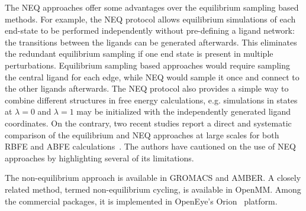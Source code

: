 \documentclass[9pt,bestpractices]{livecoms}
\begin{document}
The NEQ approaches offer some advantages over the equilibrium sampling based methods. For example, the NEQ protocol allows equilibrium simulations of each end-state to be performed independently without pre-defining a ligand network: the transitions between the ligands can be generated afterwards. This eliminates the redundant equilibrium sampling if one end state is present in multiple perturbations. Equilibrium sampling based approaches would require sampling the central ligand for each edge, while NEQ would sample it once and connect to the other ligands afterwards. The NEQ protocol also provides a simple way to combine different structures in free energy calculations, e.g. simulations in states at $\lambda=0$ and $\lambda=1$ may be initialized with the independently generated ligand coordinates. On the contrary, two recent studies report a direct and systematic comparison of the equilibrium and NEQ approaches at large scales for both RBFE and ABFE calculations~\cite{wan2023eqvsneq, bhati2025}. The authors have cautioned on the use of NEQ approaches by highlighting several of its limitations.






The non-equilibrium approach is available in GROMACS and AMBER. A closely related method, termed non-equilibrium cycling, is available in OpenMM. Among the commercial packages, it is implemented in OpenEye's Orion{\textregistered}~\cite{sorensen2024orion} platform.
\end{document}

